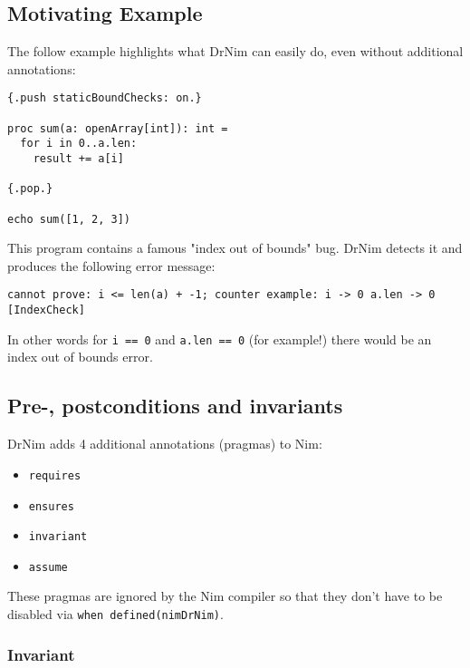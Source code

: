 \hypertarget{motivating-example}{%
\subsection{Motivating Example}\label{motivating-example}}

The follow example highlights what DrNim can easily do, even without
additional annotations:

\begin{verbatim}
{.push staticBoundChecks: on.}

proc sum(a: openArray[int]): int =
  for i in 0..a.len:
    result += a[i]

{.pop.}

echo sum([1, 2, 3])
\end{verbatim}

This program contains a famous "index out of bounds" bug. DrNim detects
it and produces the following error message:

\begin{verbatim}
cannot prove: i <= len(a) + -1; counter example: i -> 0 a.len -> 0 [IndexCheck]
\end{verbatim}

In other words for \texttt{i\ ==\ 0} and \texttt{a.len\ ==\ 0} (for
example!) there would be an index out of bounds error.

\hypertarget{pre--postconditions-and-invariants}{%
\subsection{Pre-, postconditions and
invariants}\label{pre--postconditions-and-invariants}}

DrNim adds 4 additional annotations (pragmas) to Nim:

\begin{itemize}
\tightlist
\item
  \texttt{requires}
\item
  \texttt{ensures}
\item
  \texttt{invariant}
\item
  \texttt{assume}
\end{itemize}

These pragmas are ignored by the Nim compiler so that they don't have to
be disabled via \texttt{when\ defined(nimDrNim)}.

\hypertarget{invariant}{%
\subsubsection{Invariant}\label{invariant}}

